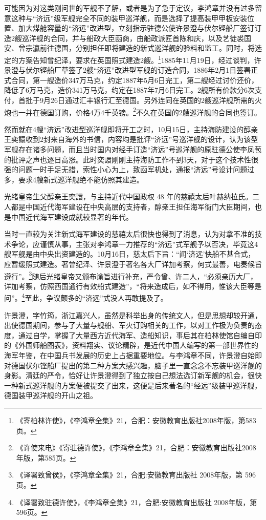 \documentclass[12pt,UTF8]{ctexbook}
\begin{document}
可能因为对这类刚问世的军舰不了解，或者是为了急于定议，李鸿章并没有过多留意这种与“济远”级军舰完全不同的装甲巡洋舰，而是选择了提高装甲甲板安装位置、加大煤舱容量的“济远”改进型，立刻指示驻德公使许景澄与伏尔铿船厂签订订造2艘巡洋舰的合同，并与船政大臣函商，由船政派匠首陈和庆，以及艺徒裘国安、曾宗瀛前往德国，分别担任即将建造的新式巡洋舰的验料和监工。同时，将选定的方案告知曾纪泽，要求在英国照式建造2艘。\footnote{《寄柏林许使》，《李鸿章全集》21，合肥：安徽教育出版社2008年版，第583页。}1885年11月19日，经过谈判，许景澄与伏尔铿船厂草签了2艘“济远”改进型军舰的订造合同，1886年2月1日签署正式合同，第一艘造价347万马克，约定1887年5月6日完工，第二艘经过讨价还价，降低了6万马克，造价341万马克，约定在1887年7月6日完工。2舰所有价款分6次支付，首批于9月26日通过汇丰银行汇至德国。另外连同在英国的2艘巡洋舰所需的火炮也一并在德国订购，价格4万4千英镑。\footnote{《许使来电》《寄驻德许使》，《李鸿章全集》21，合肥：安徽教育出版社2008年版，第585页。}不久在英国的2艘巡洋舰的合同也签订。

然而就在4艘“济远”改进型巡洋舰即将开工之时，10月15日，主持海防建设的醇亲王奕譞收到2封来自海外的书信，内容均是批评“济远”号巡洋舰的设计，认为该型军舰存在诸多问题，而且当时国内对经手订造“济远”号巡洋舰的原驻德公使李凤苞的批评之声也逐日高涨。此时奕譞刚刚主持海防工作不到3天，对于这个技术性很强的问题一时手足无措，索性小心为上，致函军机处，通报“济远”号设计问题过多，要求4艘新式巡洋舰绝不能仿照其建造。

光绪皇帝生父醇亲王奕譞，与主持近代中国政权 48 年的慈禧太后叶赫纳拉氏。二人都是中国近代海军建设在中央高层的支持者，醇亲王担任海军衙门大臣期间，也是中国近代海军建设成就较显著的年代。

当时一直较为关注新式海军建设的慈禧太后很快也得到了消息，认为对拿不准的技术争论，应谨慎从事，主张对李鸿章一力推荐的“济远”式军舰予以否决，毕竟这4艘军舰是由中央出资建造的。10月16日，慈太后下旨：“闻‘济远’快船不甚合式，应暂缓照式建造。著曾纪泽、许景澄于著名各大厂详加考察，何式最善，电奏候旨遵行”。\footnote{《译署致曾侯》，《李鸿章全集》21，合肥:安徽教育出版社 2008年版，第 596页。}随后光绪皇帝又颁布谕旨进行补充，严令曾、许二人，“必须亲历大厂，详加考察，仿照西国通行有效船式建造”，“将来造成后，如不得用，惟该大臣等是问”。\footnote{《译署致驻德许使》，《李鸿章全集》21，合肥:安徽教育出版社 2008年版，第 596页。}至此，争议颇多的“济远”式没人再敢提及了。

许景澄，字竹筠，浙江嘉兴人，虽然是科举出身的传统文人，但是思想却较开通，出使德国期间，参与了大量与舰船、军火订购相关的工作，以对工作极为负责的态度，通过自学，掌握了大量西方近代海军、造船知识，事后其在柏林使馆自编自印的《外国师船图表》，资料翔实、议论精辟，是近代中国人编写的第一部世界性的海军年鉴，在中国兵书发展的历史上占据重要地位。与李鸿章不同，许景澄自始即对德国伏尔铿船厂提出的第二种方案大感兴趣，脑子里一直念念不忘装甲巡洋舰的身影。清廷的严令，恰好让许景澄得到了独立按自己想法选订新军舰的机会，很快一种新式巡洋舰的方案便被提交了出来，这便是后来著名的“经远”级装甲巡洋舰，德国装甲巡洋舰的开山之祖。
\end{document}
